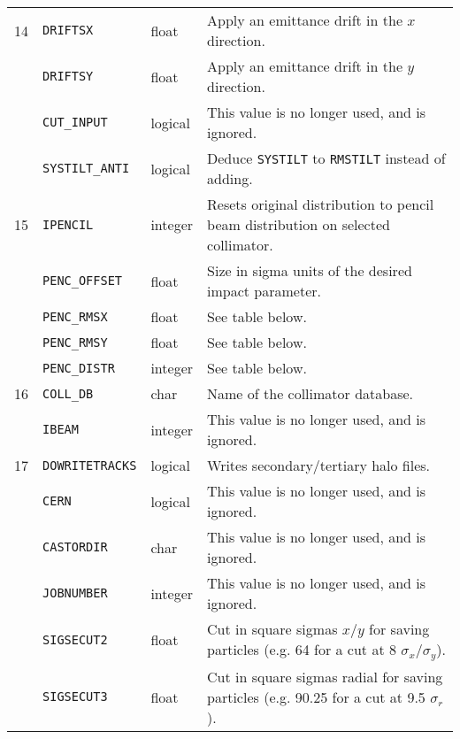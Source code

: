 \begin{center}
\begin{longtable}{| p{0.5cm} | p{2.4cm} | p{1.2cm} | >{\raggedright\arraybackslash}p{11.4cm}|}
    14  & \texttt{DRIFTSX}       & float   & Apply an emittance drift\index{emittance drift} in the $x$ direction. \\
        \cline{2-4}
        & \texttt{DRIFTSY}       & float   & Apply an emittance drift\index{emittance drift} in the $y$ direction. \\
        \cline{2-4}
        & \texttt{CUT\_INPUT}    & logical & This value is no longer used, and is ignored. \\
        \cline{2-4}
        & \texttt{SYSTILT\_ANTI} & logical & Deduce \texttt{SYSTILT} to \texttt{RMSTILT} instead of adding. \\
    \hline

    15  & \texttt{IPENCIL}       & integer & Resets original distribution to pencil beam\index{pencil beam} distribution on selected collimator. \\
        \cline{2-4}
        & \texttt{PENC\_OFFSET}  & float   & Size in sigma units of the desired impact parameter. \\
        \cline{2-4}
        & \texttt{PENC\_RMSX}    & float   & See table below. \\
        \cline{2-4}
        & \texttt{PENC\_RMSY}    & float   & See table below. \\
        \cline{2-4}
        & \texttt{PENC\_DISTR}   & integer & See table below. \\
    \hline

    16  & \texttt{COLL\_DB}      & char    & Name of the collimator database. \\
        \cline{2-4}
        & \texttt{IBEAM}         & integer & This value is no longer used, and is ignored. \\
    \hline

    17  & \texttt{DOWRITETRACKS} & logical & Writes secondary/tertiary halo files. \\
        \cline{2-4}
        & \texttt{CERN}          & logical & This value is no longer used, and is ignored. \\
        \cline{2-4}
        & \texttt{CASTORDIR}     & char    & This value is no longer used, and is ignored. \\
        \cline{2-4}
        & \texttt{JOBNUMBER}     & integer & This value is no longer used, and is ignored. \\
        \cline{2-4}
        & \texttt{SIGSECUT2}     & float   & Cut in square sigmas $x$/$y$ for saving particles (e.g. 64 for a cut at 8 $\sigma_x$/$\sigma_y$). \\
        \cline{2-4}
        & \texttt{SIGSECUT3}     & float   & Cut in square sigmas radial for saving particles (e.g. 90.25 for a cut at 9.5 $\sigma_r$). \\
    \hline
\end{longtable}
\end{center}

